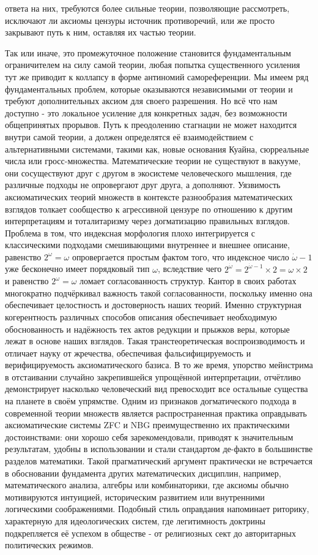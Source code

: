 \documentclass[12pt]{article}
\begin{document}
ответа на них, требуются более сильные теории, позволяющие рассмотреть, исключают ли аксиомы цензуры источник противоречий, или же просто закрывают путь к ним, оставляя их частью теории.

Так или иначе, это промежуточное положение становится фундаментальным ограничителем на силу самой теории, любая попытка существенного усиления тут же приводит к коллапсу в форме антиномий самореференции. Мы имеем ряд фундаментальных проблем, которые оказываются независимыми от теории и требуют дополнительных аксиом для своего разрешения. Но всё что нам доступно - это локальное усиление для конкретных задач, без возможности общепринятых прорывов. Путь к преодолению стагнации не может находится внутри самой теории, а должен определятся её взаимодействием с альтернативными системами, такими как, новые основания Куайна, сюрреальные числа или гросс-множества. Математические теории не существуют в вакууме, они сосуществуют друг с другом в экосистеме человеческого мышления, где различные подходы не опровергают друг друга, а дополняют. Уязвимость аксиоматических теорий множеств в контексте разнообразия математических взглядов толкает сообщество к агрессивной цензуре по отношению к другим интерпретациям и тоталитаризму через догматизацию правильных взглядов. Проблема в том, что индексная морфология плохо интегрируется с классическими подходами смешивающими внутреннее и внешнее описание, равенство $2^{\omega} = \omega$ опровергается простым фактом того, что индексное число $\dot{\omega} - 1$ уже бесконечно имеет порядковый тип $\omega$, вследствие чего $2^{\dot{\omega}} = 2^{\dot{\omega} - 1} \times 2 = \omega \times 2$ и равенство $2^{\omega} = \omega$ ломает согласованность структур. Кантор в своих работах многократно подчёркивал важность такой согласованности, поскольку именно она обеспечивает целостность и достоверность наших теорий. Именно структурная когерентность различных способов описания обеспечивает необходимую обоснованность и надёжность тех актов редукции и прыжков веры, которые лежат в основе наших взглядов. Такая транстеоретическая воспроизводимость и отличает науку от жречества, обеспечивая фальсифицируемость и верифицируемость аксиоматического базиса. В то же время, упорство мейнстрима в отстаивании случайно закрепившейся упрощённой интерпретации, отчётливо демонстрирует насколько человеческий вид превосходит все остальные существа на планете в своём упрямстве. Одним из признаков догматического подхода в современной теории множеств является распространенная практика оправдывать аксиоматические системы ZFC и NBG преимущественно их практическими достоинствами: они хорошо себя зарекомендовали, приводят к значительным результатам, удобны в использовании и стали стандартом де-факто в большинстве разделов математики. Такой прагматический аргумент практически не встречается в обосновании фундамента других математических дисциплин, например, математического анализа, алгебры или комбинаторики, где аксиомы обычно мотивируются интуицией, историческим развитием или внутренними логическими соображениями. Подобный стиль оправдания напоминает риторику, характерную для идеологических систем, где легитимность доктрины подкрепляется её успехом в обществе - от религиозных сект до авторитарных политических режимов.
\end{document}
